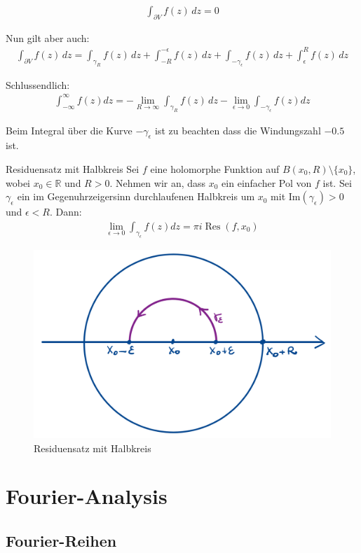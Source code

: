 \documentclass[a4paper,10pt]{article}
\def\Im{\text{Im}}
\begin{document}
\begin{align*} \int_{\partial V}f(z)\,dz=0 \end{align*} 

Nun gilt aber auch:
\begin{align*} \int_{\partial V}f(z)\,dz=\int_{\gamma_R} f(z)\,dz+\int_{-R}^{-\epsilon}f(z)\,dz+\int_{-\gamma_\epsilon} f(z)\,dz+\int_\epsilon ^Rf(z)\,dz \end{align*}

Schlussendlich:
\begin{align*} \int_{-\infty}^\infty f(z)dz= -\lim_{R\to\infty}\int_{\gamma_R}f(z)\,dz -\lim_{\epsilon\to0}\int_{-\gamma_\epsilon} f(z)dz  \end{align*}

Beim Integral über die Kurve $-\gamma_{\epsilon}$ ist zu beachten dass die Windungszahl $-0.5$ ist.

\begin{subbox}{Residuensatz mit Halbkreis}
  Sei \(f\) eine holomorphe Funktion auf \(B(x_0,R)\setminus\{x_0\}\), wobei \(x_0\in\mathbb{R}\) und \(R>0\). Nehmen wir an, dass \(x_0\) ein einfacher Pol von \(f\) ist. Sei \(\gamma_\epsilon\) ein im Gegenuhrzeigersinn durchlaufenen Halbkreis um \(x_0\) mit \(\Im(\gamma_\epsilon)>0\) und \(\epsilon< R\). Dann:
  \begin{align*} \lim_{\epsilon \to 0} \int_{\gamma_{\epsilon}} f(z) dz = \pi i \operatorname{Res}(f,x_0) \end{align*}

\end{subbox}

\begin{figure}[H]
  \centering 
  \includegraphics[width=0.5\linewidth]{assets/4-4-3.png}
  \caption{Residuensatz mit Halbkreis}
\end{figure}

\section{Fourier-Analysis}

\subsection{Fourier-Reihen}
\end{document}
